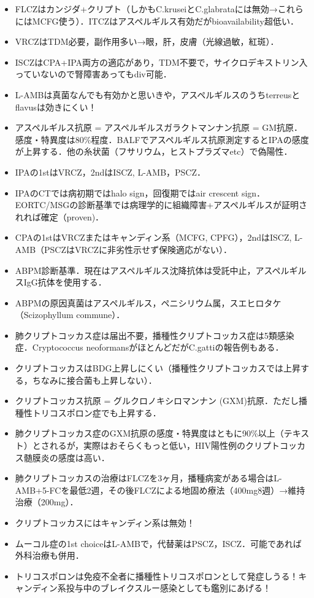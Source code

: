 \begin{itemize}
\item FLCZはカンジダ+クリプト（しかもC.kruseiとC.glabrataには無効→これらにはMCFG使う）．ITCZはアスペルギルス有効だがbioavailability超低い．
\item VRCZはTDM必要，副作用多い→眼，肝，皮膚（光線過敏，紅斑）．
\item ISCZはCPA+IPA両方の適応があり，TDM不要で，サイクロデキストリン入っていないので腎障害あってもdiv可能．
\item L-AMBは真菌なんでも有効かと思いきや，アスペルギルスのうちterreusとflavusは効きにくい！
\item アスペルギルス抗原 = アスペルギルスガラクトマンナン抗原 = GM抗原．感度・特異度は80\%程度．BALFでアスペルギルス抗原測定するとIPAの感度が上昇する．他の糸状菌（フサリウム，ヒストプラズマetc）で偽陽性．
\item IPAの1stはVRCZ，2ndはISCZ, L-AMB，PSCZ．
\item IPAのCTでは病初期ではhalo sign，回復期ではair crescent sign．EORTC/MSGの診断基準では病理学的に組織障害+アスペルギルスが証明されれば確定（proven)．
\item CPAの1stはVRCZまたはキャンディン系（MCFG, CPFG），2ndはISCZ, L-AMB（PSCZはVRCZに非劣性示せず保険適応がない）．

\item ABPM診断基準．現在はアスペルギルス沈降抗体は受託中止，アスペルギルスIgG抗体を使用する．


\item ABPMの原因真菌はアスペルギルス，ペニシリウム属，スエヒロタケ（Scizophyllum commune）．

\item 肺クリプトコッカス症は届出不要，播種性クリプトコッカス症は5類感染症．Cryptococcus neoformansがほとんどだがC.gattiの報告例もある．
\item クリプトコッカスはBDG上昇しにくい（播種性クリプトコッカスでは上昇する，ちなみに接合菌も上昇しない）．
\item クリプトコッカス抗原 = グルクロノキシロマンナン (GXM)抗原．ただし播種性トリコスポロン症でも上昇する．
\item 肺クリプトコッカス症のGXM抗原の感度・特異度はともに90\%以上（テキスト）とされるが，実際はおそらくもっと低い，HIV陽性例のクリプトコッカス髄膜炎の感度は高い．
\item 肺クリプトコッカスの治療はFLCZを3ヶ月，播種病変がある場合はL-AMB+5-FCを最低2週，その後FLCZによる地固め療法（400mg8週）→維持治療（200mg）．
\item クリプトコッカスにはキャンディン系は無効！
\item ムーコル症の1st choiceはL-AMBで，代替薬はPSCZ，ISCZ．可能であれば外科治療も併用．
\item トリコスポロンは免疫不全者に播種性トリコスポロンとして発症しうる！キャンディン系投与中のブレイクスルー感染としても鑑別にあげる！
\end{itemize}


